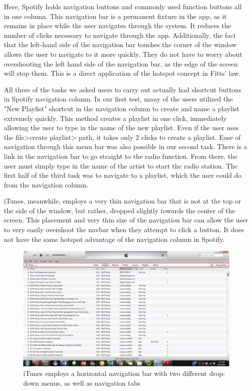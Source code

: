 \documentclass[12pt]{report}
\begin{document}
Here, Spotify holds navigation buttons and commonly used function 
buttons all in one column. This navigation bar is a permanent 
fixture in the app, as it remains in place while the user 
navigates through the system. It reduces the number of clicks 
necessary to navigate through the app. Additionally, the fact that 
the left-hand side of the navigation bar touches the corner of the 
window allows the user to navigate to it more quickly. They do not 
have to worry about overshooting the left hand side of the 
navigation bar, as the edge of the screen will stop them. This is 
a direct application of the hotspot concept in Fitts' law.

 All three of the tasks we asked users to carry out actually had 
shortcut buttons in Spotify navigation column. In our first 
test, many of the users utilized the "New Playlist" shortcut in 
the navigation column to create and name a playlist extremely 
quickly. This method creates a playlist in one click, immediately 
allowing the user to type in the name of the new playlist. Even if 
the user uses the file>create playlist> path, it takes only 2 
clicks to create a playlist. Ease of navigation through this menu 
bar was also possible in our second task. There is a link in the 
navigation bar to go straight to the radio function. From there, 
the user must simply type in the name of the artist to start the 
radio station. The first half of the third task was to navigate to 
a playlist, which the user could do from the navigation column.

iTunes, meanwhile, employs a very thin navigation bar that is not 
at the top or the side of the window, but rather, dropped slightly 
towards the center of the screen. This placement and very thin 
size of the navigation bar can allow the user to very easily 
overshoot the navbar when they attempt to click a button. It does 
not have the same hotspot advantage of the navigation column in 
Spotify.

\begin{figure}[H]
	\centering
	\includegraphics[width=\textwidth]{chart5.png}
	\caption{iTunes employs a horizontal navigation bar with 
two different drop-down menus, as well as navigation tabs}
\end{figure}
\end{document}

